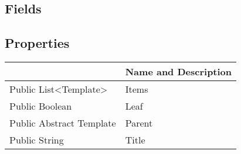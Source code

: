 \documentclass[11pt, oneside, a4paper]{book}
\begin{document}
\subsection{Fields}

\subsection{Properties}
\begin{center}
\begin{tabular}{| p{3cm} | p{12cm} | }
\hline
\textbf{ } & \textbf{ Name and Description}\\
\hline
 Public  List<Template> &  Items\hypertarget{SoftwareEngineeringTools.{}Documentation.{}SectionTemplate.{}Items}{}\\
\hline
 Public  Boolean &  Leaf\hypertarget{SoftwareEngineeringTools.{}Documentation.{}SectionTemplate.{}Leaf}{}\\
\hline
 Public  Abstract  Template &  Parent\hypertarget{SoftwareEngineeringTools.{}Documentation.{}SectionTemplate.{}Parent}{}\\
\hline
 Public  String &  Title\hypertarget{SoftwareEngineeringTools.{}Documentation.{}SectionTemplate.{}Title}{}\\
\hline
\end{tabular}
\end{center}
\end{document}
